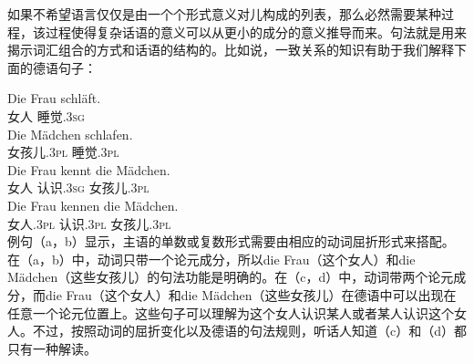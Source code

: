 如果不希望语言仅仅是由一个个形式意义对儿构成的列表，那么必然需要某种过程，该过程使得复杂话语的意义可以从更小的成分的意义推导而来。句法就是用来揭示词汇组合的方式和话语的结构的。比如说，一致关系的知识有助于我们解释下面的德语句子：

\eal
\label{Beispiel-mit-Kongruenz}
\ex 
\gll Die Frau schläft.\\
      女人 睡觉.\textsc{3sg}\\
\ex 
\gll Die Mädchen schlafen.\\
      女孩儿.\textsc{3pl} 睡觉.\textsc{3pl}\\
\ex 
\gll Die Frau kennt die Mädchen.\\
      女人 认识.\textsc{3sg}  女孩儿.\textsc{3pl}\\
\ex 
\gll Die Frau kennen die Mädchen.\\
      女人.\textsc{3pl} 认识.\textsc{3pl}  女孩儿.\textsc{3pl}\\
\zl
例句（a，b）显示，主语的单数或复数形式需要由相应的动词屈折形式来搭配。在（a，b）中，动词只带一个论元成分，所以die Frau（这个女人）和die Mädchen（这些女孩儿）的句法功能是明确的。在（c，d）中，动词带两个论元成分，而die Frau（这个女人）和die Mädchen（这些女孩儿）在德语中可以出现在任意一个论元位置上。这些句子可以理解为这个女人认识某人或者某人认识这个女人。不过，按照动词的屈折变化以及德语的句法规则，听话人知道（c）和（d）都只有一种解读。
 
